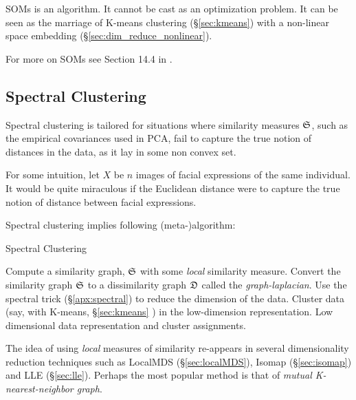 SOMs is an algorithm. It cannot be cast as an optimization problem. 
It can be seen as the marriage of K-means clustering (\S\ref{sec:kmeans}) with a non-linear space embedding (\S\ref{sec:dim_reduce_nonlinear}).



For more on SOMs see Section 14.4 in \cite{hastie_elements_2003}. 




\subsection{Spectral Clustering}
\label{sec:spectral_clustering}



Spectral clustering is tailored for situations where \naive similarity measures $\mathfrak{S}$, such as the empirical covariances used in PCA, fail to capture the true notion of distances in the data, as it lay in some non convex set. 

For some intuition, let $X$ be $n$ images of facial expressions of the same individual. It would be quite miraculous if the Euclidean distance were to capture the true notion of distance between facial expressions. 

Spectral clustering implies following (meta-)algorithm:
\begin{algorithm}[H]
\caption{Spectral Clustering}
\begin{algorithmic}
\State Compute a similarity graph, $\mathfrak{S}$ with some \emph{local} similarity measure.
\State Convert the similarity graph $\mathfrak{S}$ to a dissimilarity graph $\mathfrak{D}$ called the \emph{graph-laplacian}.
\State Use the spectral trick (\S\ref{apx:spectral}) to reduce the dimension of the data.
\State Cluster data (say, with K-means, \S\ref{sec:kmeans} ) in the low-dimension representation. 
\State \Return Low dimensional data representation and cluster assignments. 
\end{algorithmic}
\end{algorithm}



The idea of using \emph{local} measures of similarity re-appears in several dimensionality reduction techniques such as LocalMDS (\S\ref{sec:localMDS}), Isomap (\S\ref{sec:isomap}) and LLE (\S\ref{sec:lle}).
Perhaps the most popular method is that of \emph{mutual K-nearest-neighbor graph}.


